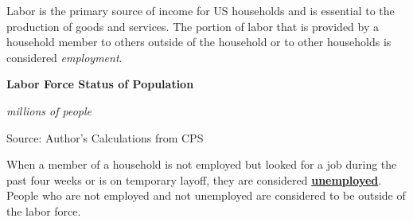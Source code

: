 \documentclass{report}
\newcommand{\tbllink}[1]{\href{https://raw.githubusercontent.com/bdecon/US-chartbook/master/chartbook/data/#1}{\faTable}}
\newcommand{\ctsbar}[5]{
		\addplot[ybar stacked, bar width=#5, draw opacity=0, fill=#1] 
			table [x=#2, y=#3, col sep=comma]{#4};}
\newcommand{\dateaxisticks}{
		date coordinates in=x, axis line style={draw=none},
		xmax={2020-10-01},
		max space between ticks=40,	    
		xtick={{1990-01-01}, {1992-01-01}, {1994-01-01}, 
			{1996-01-01}, {1998-01-01}, {2000-01-01}, 
			{2002-01-01}, {2004-01-01}, {2006-01-01},
			{2008-01-01}, {2010-01-01}, {2012-01-01}, {2014-01-01},
		    {2016-01-01}, {2018-01-01}, {2020-01-01}},
		minor xtick={{1989-01-01}, {1991-01-01}, {1993-01-01},
			{1995-01-01}, {1997-01-01}, {1999-01-01}, 
			{2001-01-01}, {2003-01-01}, {2005-01-01}, {2007-01-01},
		    {2009-01-01}, {2011-01-01}, {2013-01-01}, {2015-01-01},
		    {2017-01-01}, {2019-01-01}},
		enlarge y limits={0.06}, enlarge x limits={0.01},
		}
\newcommand{\bbar}[2]{extra #1 ticks = {{#2}}, extra #1 tick labels = ,
		extra #1 tick style = {grid=major, grid style={thick, black!25}},}
\newcommand{\rbars}{
		\fill[color=black!10] (axis cs:{1990-07-01},\pgfkeysvalueof{/pgfplots/ymin}) rectangle 
			(axis cs:{1991-03-01}, \pgfkeysvalueof{/pgfplots/ymax});
		\fill[color=black!10] (axis cs:{2007-12-01},\pgfkeysvalueof{/pgfplots/ymin}) rectangle 
			(axis cs:{2009-07-01}, \pgfkeysvalueof{/pgfplots/ymax});
		\fill[color=black!10] (axis cs:{2001-03-01},\pgfkeysvalueof{/pgfplots/ymin}) rectangle 
			(axis cs:{2001-11-01}, \pgfkeysvalueof{/pgfplots/ymax});
		\fill[color=black!10] (axis cs:{2020-02-01},\pgfkeysvalueof{/pgfplots/ymin}) rectangle 
			(axis cs:{2020-10-01}, \pgfkeysvalueof{/pgfplots/ymax});}
\begin{document}
{{{{{{\begin{minipage}{0.34\textwidth}
\small Labor is the primary source of income for US households and is essential to the production of goods and services. The portion of labor that is provided by a household member to others outside of the household or to other households is considered \textit{employment}. \\


\end{minipage} \hspace{6mm}
\begin{minipage}{0.58\textwidth}
\normalsize \textbf{Labor Force Status of Population}

\footnotesize{\textit{millions of people}}

\hspace*{-3mm} 

\footnotesize{Source: Author's Calculations from CPS} \hfill \tbllink{cps_lfs.csv}
\end{minipage}

\vspace{4mm}
\begin{minipage}{0.76\textwidth}
\small When a member of a household is not employed but looked for a job during the past four weeks or is on temporary layoff, they are considered \href{https://www.bls.gov/cps/cps_htgm.htm}{\textbf{unemployed}}. \\

People who are not employed and not unemployed are considered to be outside of the labor force.  


\end{minipage}}}}}}}
\end{document}
